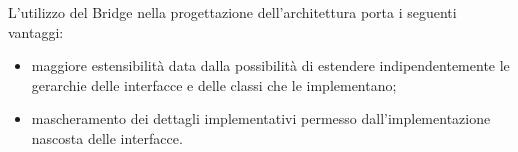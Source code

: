 L’utilizzo del  Bridge nella progettazione dell’architettura porta i seguenti vantaggi:
\begin{itemize}
\item maggiore estensibilità data dalla possibilità di estendere indipendentemente le gerarchie delle interfacce e delle classi che le implementano;
\item mascheramento dei dettagli implementativi permesso dall'implementazione nascosta delle interfacce.
\end{itemize}
